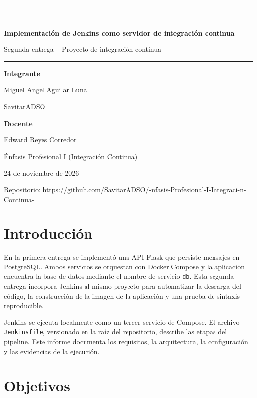 \documentclass[12pt,a4paper]{article}
\newcommand{\titulo}{Implementaci\'on de Jenkins como servidor de integraci\'on continua}
\newcommand{\materia}{\'Enfasis Profesional I (Integraci\'on Continua)}
\newcommand{\docente}{Edward Reyes Corredor}
\newcommand{\integrante}{Miguel Angel Aguilar Luna}
\newcommand{\usuario}{SavitarADSO}
\newcommand{\fecha}{24 de noviembre de 2026}
\newcommand{\repositorio}{\url{https://github.com/SavitarADSO/-nfasis-Profesional-I-Integraci-n-Continua-}}
\begin{document}
\begin{titlepage}
\centering
\vspace*{1.4cm}
{\color{negro}\rule{\textwidth}{1.5pt}}\\[0.6cm]
{\LARGE\bfseries \titulo\par}
\vspace{0.6cm}
{\large Segunda entrega -- Proyecto de integraci\'on continua\par}
{\color{negro}\rule{\textwidth}{1.5pt}}
\vspace{1.8cm}
{\large\bfseries Integrante\par}
\vspace{0.3cm}
{\Large \integrante\par}
{\usuario\par}
\vspace{1.2cm}
{\large\bfseries Docente\par}
\vspace{0.3cm}
{\Large \docente\par}
\vfill
{\large \materia\par}
\vspace{0.4cm}
{\large \fecha\par}
\vspace{0.6cm}
{\small Repositorio: \repositorio\par}
\end{titlepage}

\tableofcontents
\newpage

\section{Introducci\'on}
En la primera entrega se implement\'o una API Flask que persiste mensajes en
PostgreSQL. Ambos servicios se orquestan con Docker Compose y la aplicaci\'on
encuentra la base de datos mediante el nombre de servicio \texttt{db}. Esta
segunda entrega incorpora Jenkins al mismo proyecto para automatizar la descarga
del c\'odigo, la construcci\'on de la imagen de la aplicaci\'on y una prueba de
sintaxis reproducible.

Jenkins se ejecuta localmente como un tercer servicio de Compose. El archivo
\texttt{Jenkinsfile}, versionado en la ra\'iz del repositorio, describe las
etapas del pipeline. Este informe documenta los requisitos, la arquitectura,
la configuraci\'on y las evidencias de la ejecuci\'on.

\section{Objetivos}
\end{document}
